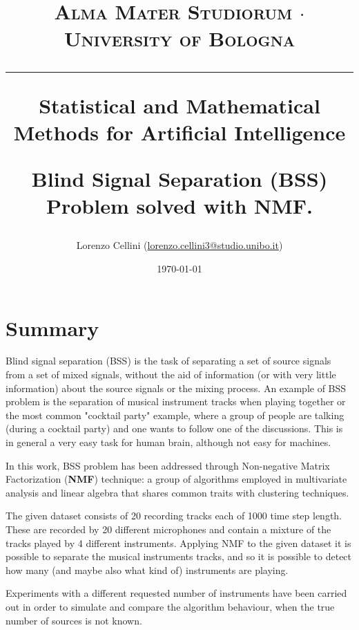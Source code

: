 \documentclass[a4paper,10pt]{report}
\begin{document}
\frenchspacing

\title{
  {{\large{\textsc{Alma Mater Studiorum $\cdot$ University of Bologna}}}}
  \rule{\textwidth}{0.4pt}\vspace{3mm}
  \small{Statistical and Mathematical Methods for Artificial Intelligence}

  \large{\textbf{Blind Signal Separation (BSS) Problem solved with NMF.}}
}

\author{Lorenzo Cellini (\href{mailto:lorenzo.cellini3@studio.unibo.it}{lorenzo.cellini3@studio.unibo.it})}
\date{\today}
\maketitle
\newpage
\tableofcontents
\setcounter{tocdepth}{1}
\newpage


\chapter{Summary}\label{chap:introduction}
Blind signal separation (BSS) is the task of separating a set of source signals from a set of mixed signals, without the aid of information (or with very little information) about the source signals or the mixing process.
An example of BSS problem is the separation of musical instrument tracks when playing together or the most common "cocktail party" example, where a group of people are talking (during a cocktail party) and one wants to follow one of the discussions.
This is in general a very easy task for human brain, although not easy for machines.

In this work, BSS problem has been addressed through Non-negative Matrix Factorization (\textbf{NMF}) technique: a group of algorithms employed in multivariate analysis and linear algebra that shares common traits with clustering techniques.

The given dataset consists of 20 recording tracks each of 1000 time step length. These are recorded by 20 different microphones and contain a mixture of the tracks played by 4 different instruments.
Applying NMF to the given dataset it is possible to separate the musical instruments tracks, and so it is possible to detect how many (and maybe also what kind of) instruments are playing.

Experiments with a different requested number of instruments have been carried out in order to simulate and compare the algorithm behaviour, when the true number of sources is not known.
\end{document}
